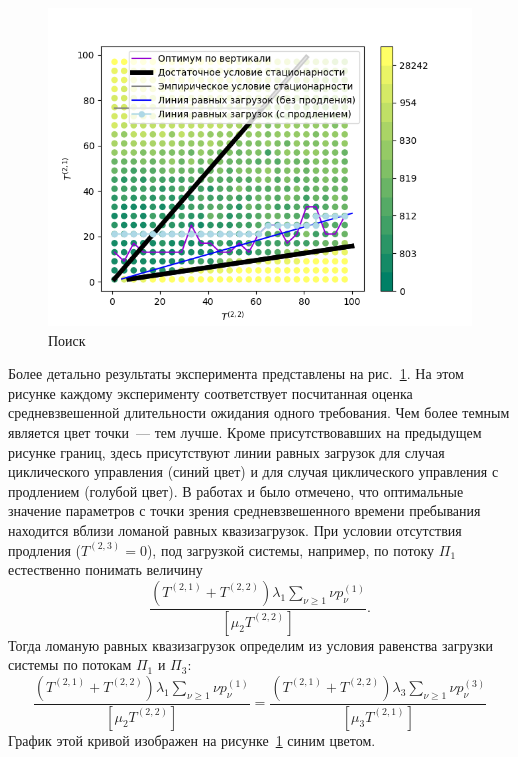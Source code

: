 \documentclass{report}
\begin{document}
\begin{figure}[h]
\centering
\includegraphics[scale=0.9]{0_1_thres_10_target.png} 
\caption{Поиск }
\label{Experiment:targets}
\end{figure}


Более детально результаты эксперимента представлены на рис.~\ref{Experiment:targets}. На этом рисунке каждому эксперименту соответствует посчитанная оценка средневзвешенной длительности ожидания одного требования. Чем более темным является цвет точки~--- тем лучше. Кроме присутствовавших на предыдущем рисунке границ, здесь присутствуют линии равных загрузок для случая циклического управления (синий цвет) и для случая циклического управления с продлением (голубой цвет). В работах \cite{Fedotkin:A:2009} и \cite{Fedotkin:Rachinskaya:2016} было отмечено, что оптимальные значение параметров с точки зрения средневзвешенного времени пребывания находится вблизи ломаной равных квазизагрузок. При условии отсутствия продления ($T^{(2,3)}=0$),  под загрузкой системы, например, по потоку $\Pi_1$ естественно понимать величину
\begin{equation}
\frac{(T^{(2,1)} + T^{(2,2)})\lambda_1 \sum_{\nu\geqslant 1}\nu p_{\nu}^{(1)}}{[\mu_2 T^{(2,2)}]}.
\end{equation}
Тогда ломаную равных квазизагрузок определим из условия равенства загрузки системы по потокам $\Pi_1$ и $\Pi_3$:
\begin{equation}
\frac{(T^{(2,1)} + T^{(2,2)})\lambda_1 \sum_{\nu\geqslant 1}\nu p_{\nu}^{(1)}}{[\mu_2 T^{(2,2)}]}=
    \frac{(T^{(2,1)} + T^{(2,2)})\lambda_3 \sum_{\nu\geqslant 1}\nu p_{\nu}^{(3)}}{[\mu_3 T^{(2,1)}]}
\end{equation}
График этой кривой изображен на рисунке~\ref{Experiment:targets} синим цветом. 
\end{document}
